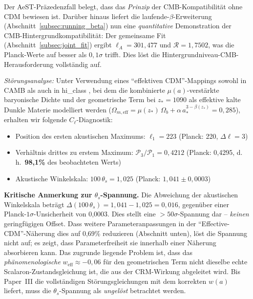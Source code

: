 \documentclass[aps,prd,twocolumn,superscriptaddress,nofootinbib,floatfix]{revtex4-2}
\begin{document}
Der AeST-Präzedenzfall belegt, dass das \textit{Prinzip} der CMB-Kompatibilität ohne CDM bewiesen ist. Darüber hinaus liefert die laufende-$\beta$-Erweiterung (Abschnitt~\ref{subsec:running_beta}) nun eine \textit{quantitative} Demonstration der CMB-Hintergrundkompatibilität: Der gemeinsame Fit (Abschnitt~\ref{subsec:joint_fit}) ergibt $\ell_A = 301{,}477$ und $\mathcal{R} = 1{,}7502$, was die Planck-Werte auf besser als $0{,}1\sigma$ trifft. Dies löst die Hintergrundniveau-CMB-Herausforderung vollständig auf.

\textit{Störungsanalyse:} Unter Verwendung eines "`effektiven CDM"'-Mappings sowohl in CAMB \cite{Lewis2000} als auch in hi\_class \cite{Zumalacarregui2017}, bei dem die kombinierte $\mu(a)$-verstärkte baryonische Dichte und der geometrische Term bei $z_* = 1090$ als effektive kalte Dunkle Materie modelliert werden ($\Omega_{m,\mathrm{eff}} = \mu(z_*)\,\Omega_b + \alpha\,a_*^{3-\beta(z_*)} = 0{,}285$), erhalten wir folgende $C_\ell$-Diagnostik:
\begin{itemize}
\item Position des ersten akustischen Maximums: $\ell_1 = 223$ (Planck: 220, $\Delta\ell = 3$)
\item Verhältnis drittes zu erstem Maximum: $\mathcal{P}_3/\mathcal{P}_1 = 0{,}4212$ (Planck: 0,4295, d.\,h.\ \textbf{98,1\%} des beobachteten Werts)
\item Akustische Winkelskala: $100\,\theta_s = 1{,}025$ (Planck: $1{,}041 \pm 0{,}0003$)
\end{itemize}

\textbf{Kritische Anmerkung zur $\theta_s$-Spannung.} Die Abweichung der akustischen Winkelskala beträgt $\Delta(100\,\theta_s) = 1{,}041 - 1{,}025 = 0{,}016$, gegenüber einer Planck-$1\sigma$-Unsicherheit von 0,0003. Dies stellt eine $>50\sigma$-Spannung dar -- \emph{keinen} geringfügigen Offset. Dass weitere Parameteranpassungen in der "`Effective-CDM"'-Näherung dies auf 0,69\% reduzieren (Abschnitt unten), löst die Spannung nicht auf; es zeigt, dass Parameterfreiheit sie innerhalb einer Näherung absorbieren kann. Das zugrunde liegende Problem ist, dass das \textit{phänomenologische} $w_\mathrm{eff} \approx -0{,}06$ für den geometrischen Term nicht dieselbe echte Scalaron-Zustandsgleichung ist, die aus der CRM-Wirkung abgeleitet wird. Bis Paper~III die vollständigen Störungsgleichungen mit dem korrekten $w(a)$ liefert, muss die $\theta_s$-Spannung als \emph{ungelöst} betrachtet werden.
\end{document}
